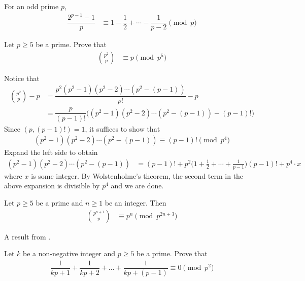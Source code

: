 	\begin{corollary}
		For an odd prime $p$,
			\begin{align*}
				\dfrac{2^{p-1}-1}{p}
					& \equiv1-\dfrac{1}{2}+\cdots-\dfrac{1}{p-2}\pmod p
			\end{align*}
	\end{corollary}

	\begin{problem}
		Let $p \geq 5$ be a prime. Prove that
			\begin{align*}
				\binom{p^2}{p}
					& \equiv p \pmod{p^5}
			\end{align*}
	\end{problem}

	\begin{solution}
		Notice that
			\begin{align*}
				\binom{p^2}{p} - p
					& =\dfrac{p^2(p^2-1)(p^2-2)\cdots(p^2-(p-1))}{p!}-p\\
					& =\dfrac{p}{(p-1)!} \Big((p^2-1)(p^2-2)\cdots(p^2-(p-1)) - (p-1)!\Big)
			\end{align*}
		Since $(p, (p-1)!)=1$, it suffices to show that
			\begin{align*}
				(p^2-1)(p^2-2)\cdots(p^2-(p-1)) \equiv (p-1)! \pmod{p^4}
			\end{align*}
		Expand the left side to obtain
			\begin{align*}
				(p^2-1)(p^2-2)\cdots(p^2-(p-1))
					& = (p-1)! + p^2\Big(1+\frac{1}{2}+\cdots+\frac{1}{p-1}\Big)\left(p-1\right)!+p^4\cdot x
			\end{align*}
		where $x$ is some integer. By Wolstenholme's theorem, the second term in the above expansion is divisible by $p^4$ and we are done.
	\end{solution}

	\begin{corollary}
		Let $p \geq 5$ be a prime and $n\geq 1$ be an integer. Then
			\begin{align*}
				\binom{p^{n+1}}{p}
					& \equiv p^n \pmod{p^{2n+3}}
			\end{align*}
	\end{corollary}
A result from \textcite{carlitz_1954}.
	\begin{problem}
		Let $k$ be a non-negative integer and $p\geq 5$ be a prime. Prove that
			\begin{align*}
				\dfrac{1}{kp+1}+ \dfrac{1}{kp+2}+ \ldots+\dfrac{1}{kp+(p-1)}\equiv 0\pmod{p^2}
			\end{align*}
	\end{problem}

